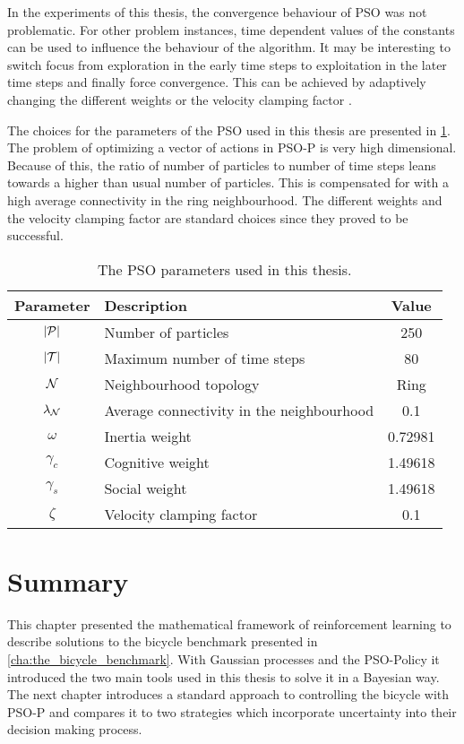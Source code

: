 In the experiments of this thesis, the convergence behaviour of PSO was not problematic.
For other problem instances, time dependent values of the constants can be used to influence the behaviour of the algorithm.
It may be interesting to switch focus from exploration in the early time steps to exploitation in the later time steps and finally force convergence.
This can be achieved by adaptively changing the different weights or the velocity clamping factor \cite{engelbrecht_fundamentals_2006}.

The choices for the parameters of the PSO used in this thesis are presented in \cref{tab:pso_parameters}.
The problem of optimizing a vector of actions in PSO-P is very high dimensional.
Because of this, the ratio of number of particles to number of time steps leans towards a higher than usual number of particles.
This is compensated for with a high average connectivity in the ring neighbourhood.
The different weights and the velocity clamping factor are standard choices since they proved to be successful.

\begin{table}[t]
    \centering
    \caption{The PSO parameters used in this thesis.}
    \label{tab:pso_parameters}
    \begin{tabularx}{\tablewidth}{cXc}
        \toprule
        Parameter & Description & Value \\
        \midrule
        $\abs{\Pe}$ & Number of particles & 250 \\
        $\vert\mathcal{T}\vert$ & Maximum number of time steps & 80 \\
        $\operatorname{\mathcal{N}}$ & Neighbourhood topology & Ring \\
        $\lambda_{\operatorname{\mathcal{N}}}$ & Average connectivity in the neighbourhood & 0.1 \\
        $\omega$ & Inertia weight & 0.72981 \\
        $\gamma_c$ & Cognitive weight & 1.49618 \\
        $\gamma_s$ & Social weight & 1.49618 \\
        $\zeta$ & Velocity clamping factor & 0.1 \\
        \bottomrule
    \end{tabularx}
\end{table}

\section{Summary}
This chapter presented the mathematical framework of reinforcement learning to describe solutions to the bicycle benchmark presented in \cref{cha:the_bicycle_benchmark}.
With Gaussian processes and the PSO-Policy it introduced the two main tools used in this thesis to solve it in a Bayesian way.
The next chapter introduces a standard approach to controlling the bicycle with PSO-P and compares it to two strategies which incorporate uncertainty into their decision making process.
